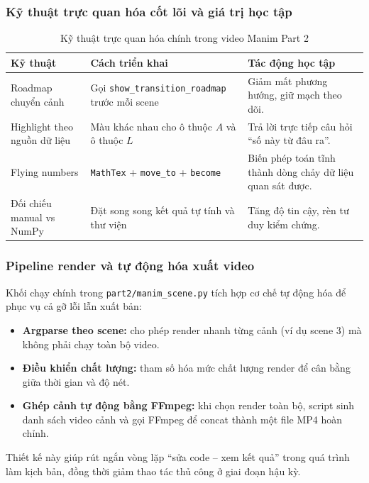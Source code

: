 \documentclass[a4paper]{article}
\begin{document}
\subsubsection{Kỹ thuật trực quan hóa cốt lõi và giá trị học tập}

\begin{table}[H]
\centering
\small
\begin{tabular}{|p{}|p{}|p{}|}
\hline
\textbf{Kỹ thuật} & \textbf{Cách triển khai} & \textbf{Tác động học tập} \\\hline
Roadmap chuyển cảnh & Gọi \texttt{show\_transition\_roadmap} trước mỗi scene & Giảm mất phương hướng, giữ mạch theo dõi. \\\hline
Highlight theo nguồn dữ liệu & Màu khác nhau cho ô thuộc $A$ và ô thuộc $L$ & Trả lời trực tiếp câu hỏi ``số này từ đâu ra''. \\\hline
Flying numbers & \texttt{MathTex} + \texttt{move\_to} + \texttt{become} & Biến phép toán tĩnh thành dòng chảy dữ liệu quan sát được. \\\hline
Đối chiếu manual vs NumPy & Đặt song song kết quả tự tính và thư viện & Tăng độ tin cậy, rèn tư duy kiểm chứng. \\\hline
\end{tabular}
\caption{Kỹ thuật trực quan hóa chính trong video Manim Part 2}
\label{tab:manim_visual_techniques}
\end{table}

\subsubsection{Pipeline render và tự động hóa xuất video}

Khối chạy chính trong \texttt{part2/manim\_scene.py} tích hợp cơ chế tự động hóa để phục vụ cả gỡ lỗi lẫn xuất bản:
\begin{itemize}
    \item \textbf{Argparse theo scene:} cho phép render nhanh từng cảnh (ví dụ scene 3) mà không phải chạy toàn bộ video.
    \item \textbf{Điều khiển chất lượng:} tham số hóa mức chất lượng render để cân bằng giữa thời gian và độ nét.
    \item \textbf{Ghép cảnh tự động bằng FFmpeg:} khi chọn render toàn bộ, script sinh danh sách video cảnh và gọi FFmpeg để concat thành một file MP4 hoàn chỉnh.
\end{itemize}

Thiết kế này giúp rút ngắn vòng lặp ``sửa code -- xem kết quả'' trong quá trình làm kịch bản, đồng thời giảm thao tác thủ công ở giai đoạn hậu kỳ.
\end{document}
